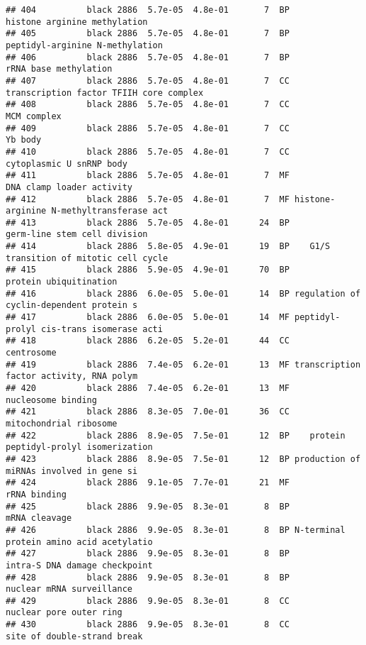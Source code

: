 \documentclass[]{article}
\begin{document}
\begin{verbatim}
## 404          black 2886  5.7e-05  4.8e-01       7  BP             histone arginine methylation
## 405          black 2886  5.7e-05  4.8e-01       7  BP          peptidyl-arginine N-methylation
## 406          black 2886  5.7e-05  4.8e-01       7  BP                    rRNA base methylation
## 407          black 2886  5.7e-05  4.8e-01       7  CC  transcription factor TFIIH core complex
## 408          black 2886  5.7e-05  4.8e-01       7  CC                              MCM complex
## 409          black 2886  5.7e-05  4.8e-01       7  CC                                  Yb body
## 410          black 2886  5.7e-05  4.8e-01       7  CC                 cytoplasmic U snRNP body
## 411          black 2886  5.7e-05  4.8e-01       7  MF                DNA clamp loader activity
## 412          black 2886  5.7e-05  4.8e-01       7  MF histone-arginine N-methyltransferase act
## 413          black 2886  5.7e-05  4.8e-01      24  BP             germ-line stem cell division
## 414          black 2886  5.8e-05  4.9e-01      19  BP    G1/S transition of mitotic cell cycle
## 415          black 2886  5.9e-05  4.9e-01      70  BP                   protein ubiquitination
## 416          black 2886  6.0e-05  5.0e-01      14  BP regulation of cyclin-dependent protein s
## 417          black 2886  6.0e-05  5.0e-01      14  MF peptidyl-prolyl cis-trans isomerase acti
## 418          black 2886  6.2e-05  5.2e-01      44  CC                               centrosome
## 419          black 2886  7.4e-05  6.2e-01      13  MF transcription factor activity, RNA polym
## 420          black 2886  7.4e-05  6.2e-01      13  MF                       nucleosome binding
## 421          black 2886  8.3e-05  7.0e-01      36  CC                   mitochondrial ribosome
## 422          black 2886  8.9e-05  7.5e-01      12  BP    protein peptidyl-prolyl isomerization
## 423          black 2886  8.9e-05  7.5e-01      12  BP production of miRNAs involved in gene si
## 424          black 2886  9.1e-05  7.7e-01      21  MF                             rRNA binding
## 425          black 2886  9.9e-05  8.3e-01       8  BP                            mRNA cleavage
## 426          black 2886  9.9e-05  8.3e-01       8  BP N-terminal protein amino acid acetylatio
## 427          black 2886  9.9e-05  8.3e-01       8  BP            intra-S DNA damage checkpoint
## 428          black 2886  9.9e-05  8.3e-01       8  BP                nuclear mRNA surveillance
## 429          black 2886  9.9e-05  8.3e-01       8  CC                  nuclear pore outer ring
## 430          black 2886  9.9e-05  8.3e-01       8  CC              site of double-strand break

\end{verbatim}
\end{document}
